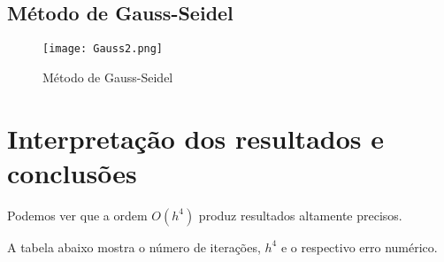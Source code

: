 \documentclass[]{article}
\begin{document}
\subsection{Método de Gauss-Seidel}

\begin{figure}[!h]
\texttt{[image: Gauss2.png]}
\centering 
\caption{Método de Gauss-Seidel} 
\label{fig1}
\end{figure}



\break
\section{Interpretação dos resultados e conclusões}

Podemos ver que a ordem $O(h^4)$ produz resultados altamente precisos.

A tabela abaixo mostra o número de iterações, $h^4$ e o respectivo erro numérico.
\\
\end{document}
